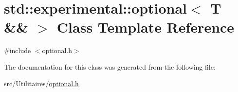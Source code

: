 \hypertarget{classstd_1_1experimental_1_1optional_3_01_t_01_6_6_01_4}{}\section{std\+:\+:experimental\+:\+:optional$<$ T \&\& $>$ Class Template Reference}
\label{classstd_1_1experimental_1_1optional_3_01_t_01_6_6_01_4}


{\ttfamily \#include $<$optional.\+h$>$}



The documentation for this class was generated from the following file\+:\begin{DoxyCompactItemize}
\item 
src/\+Utilitaires/\mbox{\hyperlink{optional_8h}{optional.\+h}}\end{DoxyCompactItemize}
